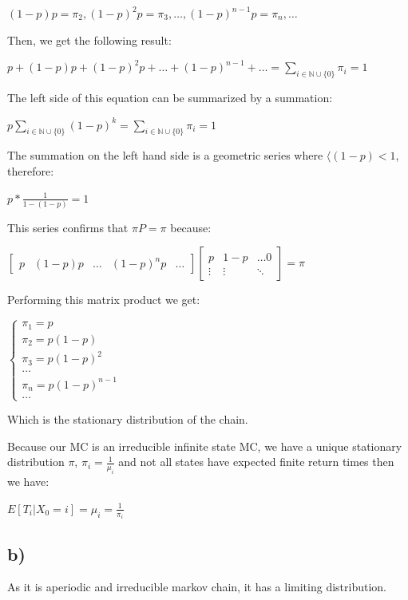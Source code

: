 \documentclass[
]{article}
\begin{document}
\((1 - p)p = \pi_{2}, (1 - p)^{2} p = \pi_{3}, \dots, (1 - p)^{n-1} p = \pi_{n}, \dots\)

Then, we get the following result:

\(p + (1-p)p + (1-p)^{2} p + \dots + (1-p)^{n-1} + \dots = \sum_{i \in \mathbb{N} \cup \{0\}} \pi_{i} = 1\)

The left side of this equation can be summarized by a summation:

\(p \sum_{i \in \mathbb{N} \cup \{0\}} (1-p)^{k} = \sum_{i \in \mathbb{N} \cup \{0\}} \pi_{i} = 1\)

The summation on the left hand side is a geometric series where
\(\langle{(1-p)} < 1\), therefore:

\(p * \frac{1}{1 - (1 - p)} = 1\)

This series confirms that \(\pi P = \pi\) because:

\(\begin{bmatrix} p & (1 - p)p & \dots & (1 - p)^{n} p & \dots \end{bmatrix} \begin{bmatrix} p & 1-p & \dots 0 \\ \vdots & \vdots & \ddots \end{bmatrix} = \pi\)

Performing this matrix product we get:

\(\begin{cases} \pi_{1} = p \\ \pi_{2} = p (1-p) \\ \pi_{3} = p (1-p)^{2} \\ \dots \\ \pi_{n} = p (1-p)^{n-1} \\ \dots \end{cases}\)

Which is the stationary distribution of the chain.

Because our MC is an irreducible infinite state MC, we have a unique
stationary distribution \(\pi\), \(\pi_{i} = \frac{1}{\mu_{i}}\) and not
all states have expected finite return times then we have:

\(E[T_{i}|X_{0} = i] = \mu_{i} = \frac{1}{\pi_{i}}\)

\newpage

\hypertarget{b-1}{%
\subsection{b)}\label{b-1}}

As it is aperiodic and irreducible markov chain, it has a limiting
distribution.
\end{document}
